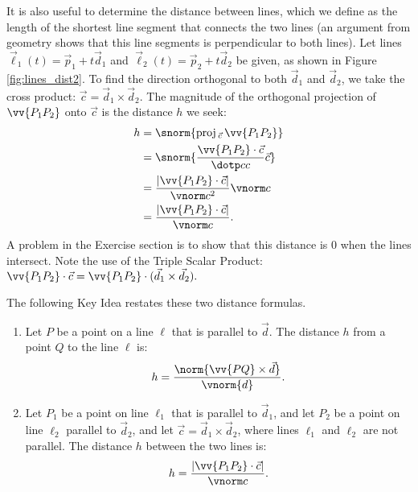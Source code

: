 It is also useful to determine the distance between lines, which we define as the length of the shortest line segment that connects the two lines (an argument from geometry shows that this line segments is perpendicular to both lines). Let lines $\vec\ell_1(t) = \vec p_1 + t\vec d_1$ and $\vec\ell_2(t) = \vec p_2 + t\vec d_2$ be given, as shown in Figure \ref{fig:lines_dist2}. To find the direction orthogonal to both $\vec d_1$ and $\vec d_2$, we take the cross product: $\vec c = \vec d_1\times \vec d_2$. The magnitude of the orthogonal projection of $\vv{P_1P_2}$ onto $\vec c$ is the distance $h$ we seek:
\begin{align*}
h&=		\snorm{\text{proj}\,_{\vec c}\,\vv{P_1P_2}}\\
	&= \snorm{\frac{\vv{P_1P_2}\cdot\vec c}{\dotp cc}\vec c}\\
	&=\frac{|\vv{P_1P_2}\cdot \vec c|}{\vnorm c^2}\vnorm c\\
	&=\frac{|\vv{P_1P_2}\cdot \vec c|}{\vnorm c}.
\end{align*}
A problem in the Exercise section is to show that this distance is 0 when the lines intersect. Note the use of the Triple Scalar Product: $\vv{P_1P_2}\cdot \vec c = \vv{P_1P_2}\cdot (\vec d_1\times \vec d_2).$


The following Key Idea restates these two distance formulas.

{\begin{enumerate}
	\item Let $P$ be a point on a line $\ell$ that is parallel to $\vec d$. The distance $h$ from a point $Q$ to the line $\ell$ is:
	$$h =\frac{\norm{\vv{PQ}\times \vec d}}{\vnorm{d}}.$$
	\item	Let $P_1$ be a point on line $\ell_1$ that is parallel to $\vec d_1$, and let $P_2$ be a point on line $\ell_2$ parallel to $\vec d_2$, and let $\vec c = \vec d_1\times \vec d_2$, where lines $\ell_1$ and $\ell_2$ are not parallel. The distance $h$ between the two lines is:
	$$h=\frac{|\vv{P_1P_2}\cdot \vec c|}{\vnorm c}.$$
\end{enumerate}
}


